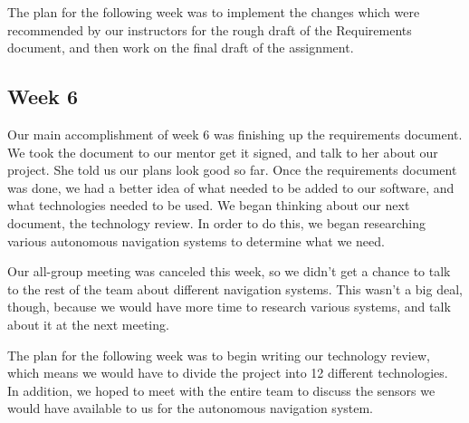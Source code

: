 \documentclass[10pt,letterpaper,onecolumn,draftclsnofoot,journal]{IEEEtran}
\begin{document}
\par 
The plan for the following week was to implement the changes which were recommended by our instructors for the rough draft of the Requirements document, and then work on the final draft of the assignment.

\subsection{Week 6}
\par
Our main accomplishment of week 6 was finishing up the requirements document. We took the document to our mentor get it signed, and talk to her about our project. She told us our plans look good so far. Once the requirements document was done, we had a better idea of what needed to be added to our software, and what technologies needed to be used. We began thinking about our next document, the technology review. In order to do this, we began researching various autonomous navigation systems to determine what we need.\vspace{.3cm}
\par
Our all-group meeting was canceled this week, so we didn't get a chance to talk to the rest of the team about different navigation systems. This wasn't a big deal, though, because we would have more time to research various systems, and talk about it at the next meeting.\vspace{.3cm}
\par
The plan for the following week was to begin writing our technology review, which means we would have to divide the project into 12 different technologies. In addition, we hoped to meet with the entire team to discuss the sensors we would have available to us for the autonomous navigation system.\vspace{.3cm}
\end{document}
